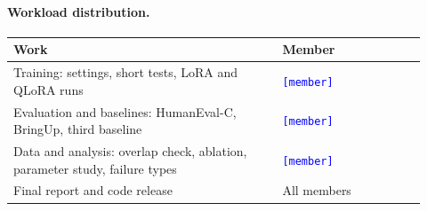 \documentclass{article}
\newcommand{\placeholder}[1]{\texttt{\textcolor{blue}{[#1]}}}
\begin{document}
\paragraph{Workload distribution.}
\begin{center}
\begin{tabular}{p{0.60\linewidth} p{0.32\linewidth}}
\toprule
\textbf{Work} & \textbf{Member} \\
\midrule
Training: settings, short tests, LoRA and QLoRA runs & \placeholder{member} \\
Evaluation and baselines: HumanEval-C, BringUp, third baseline & \placeholder{member} \\
Data and analysis: overlap check, ablation, parameter study, failure types & \placeholder{member} \\
Final report and code release & All members \\
\bottomrule
\end{tabular}
\end{center}
\end{document}
